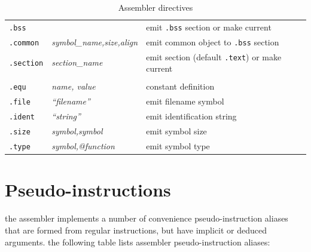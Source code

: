 \begin{table}[h]
\begin{tabular}{|l|l|l|}
\texttt{.bss}     &         & emit \texttt{.bss} section or make current     \\
\texttt{.common}  & \emph{symbol\_name,size,align} & emit common object to
\texttt{.bss} section \\
\texttt{.section} & \emph{section\_name}    & emit section (default
\texttt{.text}) or make current \\
\hline
\rowcolor{tscol}
\multicolumn{3}{|l|}{\tsub{Miscellaneous directives}} \\ \hline
\texttt{.equ}    & \emph{name, value}       & constant definition            \\
\texttt{.file}   & \emph{“filename”}        & emit filename symbol           \\
\texttt{.ident}  & \emph{“string”}          & emit identification string     \\
\texttt{.size}   & \emph{symbol,symbol}     & emit symbol size               \\
\texttt{.type}   & \emph{symbol,@function}  & emit symbol type               \\
\hline
\end{tabular}
\caption{Assembler directives}
\label{tab:assembler-directives}
\end{table}

\newpage
\section{Pseudo-instructions}

the assembler implements a number of convenience pseudo-instruction aliases
that are formed from regular instructions, but have implicit or deduced arguments.
\para
the following table lists \arch{} assembler pseudo-instruction aliases:

